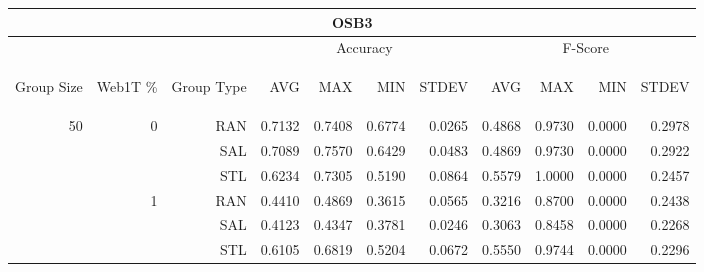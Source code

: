\begin{center}
\begin{table}[htbp] 
 \begin{center}
\begin{tabular}{ | r | r | r | r | r | r | r | r | r | r | r |}
\hline
\multicolumn{11}{|c|}{OSB3}\\
\hline
 & & & \multicolumn{4}{|c|}{Accuracy} & \multicolumn{4}{|c|}{F-Score}\\ \cline{4-11}
\begin{sideways}Group Size\end{sideways} & \begin{sideways}Web1T \%\end{sideways} & \begin{sideways}Group Type\end{sideways} & \begin{sideways}AVG\end{sideways} & \begin{sideways}MAX\end{sideways} & \begin{sideways}MIN\end{sideways} & \begin{sideways}STDEV\end{sideways} & \begin{sideways}AVG\end{sideways} & \begin{sideways}MAX\end{sideways} & \begin{sideways}MIN\end{sideways} & \begin{sideways}STDEV\end{sideways}\\
\hline
\multirow{12}{*}{50}
 & \multirow{3}{*}{0} & RAN & 0.7132 & 0.7408 & 0.6774 & 0.0265 & 0.4868 & 0.9730 & 0.0000 & 0.2978\\ \cline{3-11}
 &   & SAL & 0.7089 & 0.7570 & 0.6429 & 0.0483 & 0.4869 & 0.9730 & 0.0000 & 0.2922\\ \cline{3-11}
 &   & STL & 0.6234 & 0.7305 & 0.5190 & 0.0864 & 0.5579 & 1.0000 & 0.0000 & 0.2457\\ \cline{2-11}
 & \multirow{3}{*}{1} & RAN & 0.4410 & 0.4869 & 0.3615 & 0.0565 & 0.3216 & 0.8700 & 0.0000 & 0.2438\\ \cline{3-11}
 &   & SAL & 0.4123 & 0.4347 & 0.3781 & 0.0246 & 0.3063 & 0.8458 & 0.0000 & 0.2268\\ \cline{3-11}
 &   & STL & 0.6105 & 0.6819 & 0.5204 & 0.0672 & 0.5550 & 0.9744 & 0.0000 & 0.2296\\ \cline{2-11}

\end{tabular}
\end{center}
\end{table}
\end{center}
